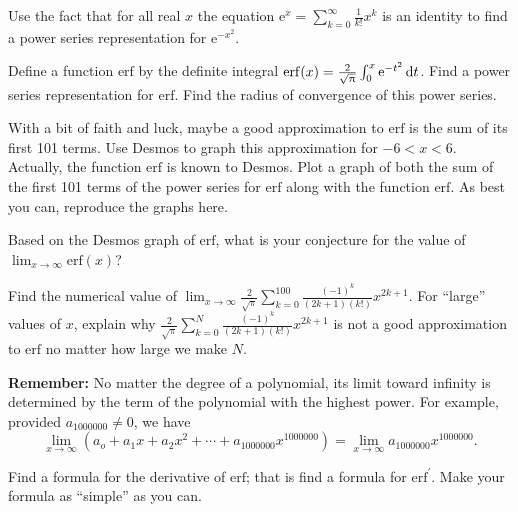 \documentclass[12pt,fleqn]{exam}
\newcommand{\erf}{\mathrm{erf}}
\begin{document}
\begin{questions} 

\question [1] Use the fact that for all real $x$ the equation $\displaystyle \mathrm{e}^x = \sum_{k=0}^\infty \frac{1}{k!}  x^k$ is an identity 
 to find a power series representation for $\mathrm{e}^{-x^2} $.
\begin{solution}[2.5in]

\end{solution}


\question [1] Define a function $\erf$ by the definite integral $\erf(x) = \frac{2}{\sqrt{\uppi}} \large \int_0^x \mathrm{e}^{-t^2} \, \mathrm{d} t$.
Find a power series representation for $\erf$.  Find the radius of convergence of this power series.
\begin{solution}%

\end{solution}

\newpage

\question [1]  With a bit of faith and luck, maybe a good approximation to $\erf$ is the sum of its first 101 terms.
Use Desmos to graph this approximation for $-6 < x < 6$.   Actually, the function $\erf$ is known to Desmos. Plot
a graph of both the sum of the first 101 terms of the power series for $\erf$ along with the function $\erf$.
As best you can, reproduce the graphs here.


\begin{solution}[1.5in]

\end{solution}


\question [1] Based on the Desmos graph of $\erf$, what is your conjecture for the value of $\displaystyle \lim_{x \to \infty} \erf(x)$? 


\begin{solution}%

\end{solution}

\newpage

\question [1]  Find the numerical value of $\displaystyle \lim_{x \to \infty}  \frac{2}{\sqrt{\uppi}}  \sum_{k=0}^{100} 
\frac{(-1)^k}{ (2 k + 1) (k !)}   x^{2 k +1}$.  For ``large'' values of $x$, explain why 
$\frac{2}{\sqrt{\uppi}}  \sum_{k=0}^{N} \frac{(-1)^k}{ (2 k + 1) (k !)}   x^{2 k +1}$ is not a good approximation to $\erf$
no matter how large we make $N$.  

\textbf{Remember:} No matter the degree of a polynomial, its limit toward infinity is determined 
by the term of the polynomial with the highest power.  For example, provided $a_{1 000 000} \neq 0$, we have 
\begin{equation*}
  \lim_{x \to \infty}  \left( a_o + a_1 x + a_2 x^2 + \cdots + a_{1 000 000} x^{1 000 000} \right)  =  \lim_{x \to \infty} a_{1 000 000} x^{1 000 000} .
\end{equation*}

\begin{solution}[3.5in]

\end{solution}

\question  [1] Find a formula for the derivative of $\erf$; that is find a formula for $\erf^\prime$.  Make your formula as ``simple'' as you
can.



\end{questions}
\end{document}

